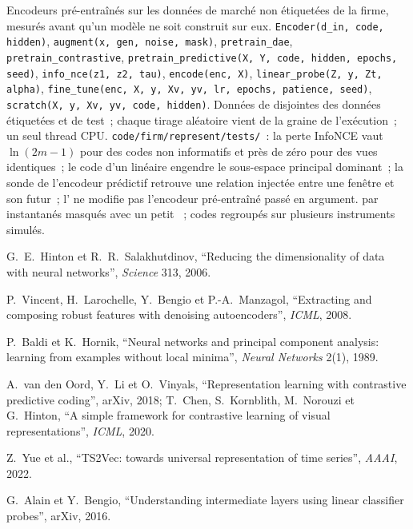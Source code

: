 \begin{build}
 Encodeurs pré-entraînés sur les données de marché non étiquetées de la firme, mesurés avant qu'un modèle ne soit construit sur eux.
 \texttt{Encoder(d\_in, code, hidden)}, \texttt{augment(x, gen, noise, mask)},
\texttt{pretrain\_dae}, \texttt{pretrain\_contrastive}, \texttt{pretrain\_predictive(X, Y, code, hidden, epochs, seed)},
\texttt{info\_nce(z1, z2, tau)}, \texttt{encode(enc, X)}, \texttt{linear\_probe(Z, y, Zt, alpha)},
\texttt{fine\_tune(enc, X, y, Xv, yv, lr, epochs, patience, seed)}, \texttt{scratch(X, y, Xv, yv, code, hidden)}.
 Données de  disjointes des données étiquetées et de test~; chaque tirage aléatoire vient de la graine de l'exécution~; un seul
thread CPU.
 \texttt{code/firm/represent/tests/}~: la perte InfoNCE vaut $\ln(2m-1)$ pour des codes non informatifs et
près de zéro pour des vues identiques~; le code d'un  linéaire engendre le sous-espace principal dominant~; la sonde de l'encodeur prédictif
retrouve une relation injectée entre une fenêtre et son futur~; l' ne modifie pas l'encodeur
pré-entraîné passé en argument.
  par instantanés masqués avec un petit ~; codes regroupés sur plusieurs
instruments simulés.
\end{build}

\begin{omsources}
\item G.~E.~Hinton et R.~R.~Salakhutdinov, ``Reducing the dimensionality of data with neural networks'', \emph{Science}
313, 2006.
\item P.~Vincent, H.~Larochelle, Y.~Bengio et P.-A.~Manzagol, ``Extracting and composing robust features with denoising
autoencoders'', \emph{ICML}, 2008.
\item P.~Baldi et K.~Hornik, ``Neural networks and principal component analysis: learning from examples without local
minima'', \emph{Neural Networks} 2(1), 1989.
\item A.~van den Oord, Y.~Li et O.~Vinyals, ``Representation learning with contrastive predictive coding'', arXiv, 2018;
T.~Chen, S.~Kornblith, M.~Norouzi et G.~Hinton, ``A simple framework for contrastive learning of visual representations'',
\emph{ICML}, 2020.
\item Z.~Yue et al., ``TS2Vec: towards universal representation of time series'', \emph{AAAI}, 2022.
\item G.~Alain et Y.~Bengio, ``Understanding intermediate layers using linear classifier probes'', arXiv, 2016.
\end{omsources}

